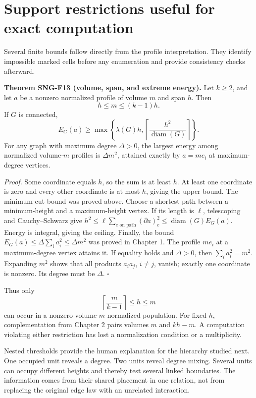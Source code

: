 \documentclass[
  11pt,
  a4paper,
]{report}
\begin{document}
\hypertarget{support-restrictions-useful-for-exact-computation}{%
\section{Support restrictions useful for exact
computation}\label{support-restrictions-useful-for-exact-computation}}

Several finite bounds follow directly from the profile interpretation.
They identify impossible marked cells before any enumeration and provide
consistency checks afterward.

\textbf{Theorem SNG-F13 (volume, span, and extreme energy).} Let
\(k\ge2\), and let \(a\) be a nonzero normalized profile of volume \(m\)
and span \(h\). Then \[
h\le m\le(k-1)h.
\] If \(G\) is connected, \[
E_G(a)\ge\max\left\{\lambda(G)h,
\left\lceil\frac{h^2}{\operatorname{diam}(G)}\right\rceil\right\}.
\] For any graph with maximum degree \(\Delta>0\), the largest energy
among normalized volume-\(m\) profiles is \(\Delta m^2\), attained
exactly by \(a=m e_i\) at maximum-degree vertices.

\emph{Proof.} Some coordinate equals \(h\), so the sum is at least
\(h\). At least one coordinate is zero and every other coordinate is at
most \(h\), giving the upper bound. The minimum-cut bound was proved
above. Choose a shortest path between a minimum-height and a
maximum-height vertex. If its length is \(\ell\), telescoping and
Cauchy--Schwarz give
\(h^2\le\ell\sum_{e\text{ on path}}(\partial a)_e^2\le\operatorname{diam}(G)E_G(a)\).
Energy is integral, giving the ceiling. Finally, the bound
\(E_G(a)\le\Delta\sum_i a_i^2\le\Delta m^2\) was proved in Chapter 1.
The profile \(m e_i\) at a maximum-degree vertex attains it. If equality
holds and \(\Delta>0\), then \(\sum_i a_i^2=m^2\). Expanding \(m^2\)
shows that all products \(a_i a_j\), \(i\ne j\), vanish; exactly one
coordinate is nonzero. Its degree must be \(\Delta\). \(\square\)

Thus only \[
\left\lceil\frac{m}{k-1}\right\rceil\le h\le m
\] can occur in a nonzero volume-\(m\) normalized population. For fixed
\(h\), complementation from Chapter 2 pairs volumes \(m\) and \(kh-m\).
A computation violating either restriction has lost a normalization
condition or a multiplicity.

Nested thresholds provide the human explanation for the hierarchy
studied next. One occupied unit reveals a degree. Two units reveal
degree mixing. Several units can occupy different heights and thereby
test several linked boundaries. The information comes from their shared
placement in one relation, not from replacing the original edge law with
an unrelated interaction.
\end{document}
